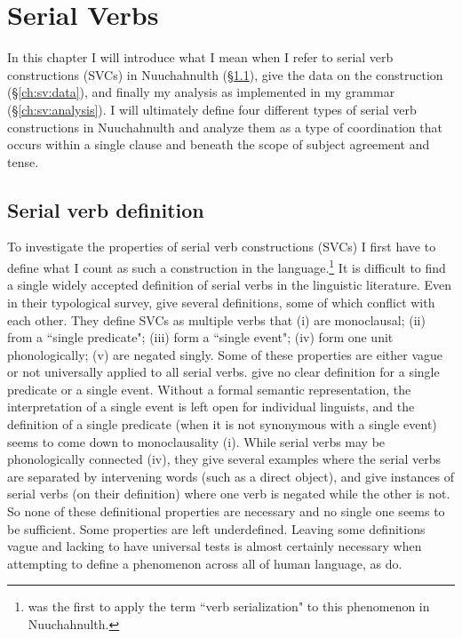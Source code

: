\chapter{Serial Verbs} \label{ch:sv}

In this chapter I will introduce what I mean when I refer to serial verb constructions (SVCs) in Nuuchahnulth (\S\ref{ch:sv:def}), give the data on the construction (\S\ref{ch:sv:data}), and finally my analysis as implemented in my grammar (\S\ref{ch:sv:analysis}). I will ultimately define four different types of serial verb constructions in Nuuchahnulth and analyze them as a type of coordination that occurs within a single clause and beneath the scope of subject agreement and tense.

\section{Serial verb definition} \label{ch:sv:def}

To investigate the properties of serial verb constructions (SVCs) I first have to define what I count as such a construction in the language.\footnote{\citet{jacobsen1993} was the first to apply the term ``verb serialization" to this phenomenon in Nuuchahnulth.}  It is difficult to find a single widely accepted definition of serial verbs in the linguistic literature. Even in their typological survey, \citet{aikhenvalddixon2006} give several definitions, some of which conflict with each other. They define SVCs as multiple verbs that (i) are monoclausal; (ii) from a ``single predicate"; (iii) form a ``single event"; (iv) form one unit phonologically; (v) are negated singly. Some of these properties are either vague or not universally applied to all serial verbs. \citeauthor{aikhenvalddixon2006} give no clear definition for a single predicate or a single event. Without a formal semantic representation, the interpretation of a single event is left open for individual linguists, and the definition of a single predicate (when it is not synonymous with a single event) seems to come down to monoclausality (i). While serial verbs may be phonologically connected (iv), they give several examples where the serial verbs are separated by intervening words (such as a direct object), and give instances of serial verbs (on their definition) where one verb is negated while the other is not. So none of these definitional properties are necessary and no single one seems to be sufficient. Some properties are left underdefined. Leaving some definitions vague and lacking to have universal tests is almost certainly necessary when attempting to define a phenomenon across all of human language, as \citeauthor{aikhenvalddixon2006} do.

